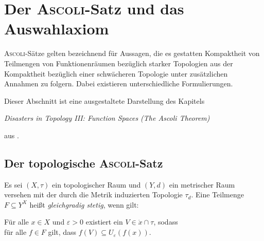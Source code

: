 \chapter{Der \textsc{Ascoli}-Satz und das Auswahlaxiom}

\textsc{Ascoli}-Sätze gelten bezeichnend für Aussagen, die es gestatten Kompaktheit von Teilmengen von Funktionenräumen bezüglich starker Topologien aus der Kompaktheit bezüglich einer schwächeren Topologie unter zusätzlichen Annahmen zu folgern. Dabei existieren unterschiedliche Formulierungen.

Dieser Abschnitt ist eine ausgestaltete Darstellung des Kapitels  
\begin{addmargin}[2em]{2em}%
  \textit{Disasters in Topology III: Function Spaces (The Ascoli Theorem)}
\end{addmargin}
aus \cite{herrlich2006axiom}. 


\section{Der topologische \textsc{Ascoli}-Satz}

\begin{defn}
  Es sei $(X,\tau)$ ein topologischer Raum und $(Y,d)$ ein metrischer Raum versehen mit der durch die Metrik induzierten Topologie $\tau_d$. Eine Teilmenge $F \subseteq Y^X$ heißt \textit{gleichgradig stetig}, wenn gilt:
  \begin{addmargin}[2em]{2em}%
    Für alle $x \in X$ und $\varepsilon > 0$ existiert ein $V \in \dot{x} \cap \tau$, sodass \\
    für alle $f \in F$ gilt, dass $f(V) \subseteq U_\varepsilon(f(x))$.
  \end{addmargin}
\end{defn}

